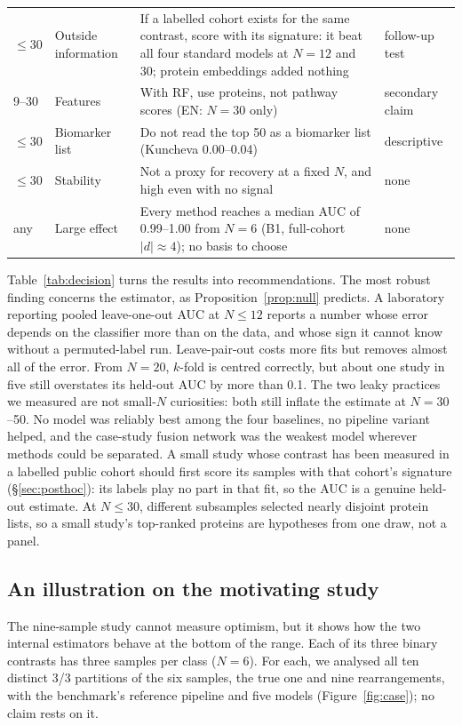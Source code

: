 \documentclass[10pt,letterpaper]{article}
\begin{document}
\begin{table}[!t]
\begin{tabularx}{\textwidth}{@{}l l X l@{}}
$\le 30$ & Outside information & If a labelled cohort exists for the same contrast, score with its signature: it beat all four standard models at $N = 12$ and 30; protein embeddings added nothing & follow-up test \\
9--30 & Features & With RF, use proteins, not pathway scores (EN: $N = 30$ only) & secondary claim \\
$\le 30$ & Biomarker list & Do not read the top 50 as a biomarker list (Kuncheva 0.00--0.04) & descriptive \\
$\le 30$ & Stability & Not a proxy for recovery at a fixed $N$, and high even with no signal & none \\
any & Large effect & Every method reaches a median AUC of 0.99--1.00 from $N = 6$ (B1, full-cohort $|d| \approx 4$); no basis to choose & none \\
\bottomrule
\end{tabularx}
\end{table}

Table~\ref{tab:decision} turns the results into recommendations. The most robust finding concerns the
estimator, as Proposition~\ref{prop:null} predicts. A laboratory reporting pooled leave-one-out AUC at $N \le 12$ reports a number whose
error depends on the classifier more than on the data, and whose sign it cannot know without a permuted-label
run. Leave-pair-out costs more fits but removes almost all of the error. From $N = 20$, $k$-fold is centred
correctly, but about one study in five still overstates its held-out AUC by more than 0.1. The two leaky practices we measured are not small-$N$ curiosities: both still inflate the estimate
at $N = 30$--50. No model was reliably best among the four baselines, no pipeline variant helped, and the
case-study fusion network was the weakest model wherever methods could be separated. A small study whose contrast has been measured in a labelled public cohort should first score its samples with that cohort's signature (\S\ref{sec:posthoc}): its labels play no part in that fit, so the AUC is a genuine held-out estimate. At $N \le 30$, different
subsamples selected nearly disjoint protein lists, so a small study's top-ranked proteins are hypotheses from
one draw, not a panel.

\subsection{An illustration on the motivating study}\label{sec:case}
The nine-sample study cannot measure optimism, but it shows how the two internal estimators behave at the
bottom of the range. Each of its three binary contrasts has three samples per class ($N = 6$).
For each, we analysed all ten distinct 3/3 partitions of the six samples, the true one and nine rearrangements, with the
benchmark's reference pipeline and five models (Figure~\ref{fig:case}); no claim rests on it.
\end{document}
